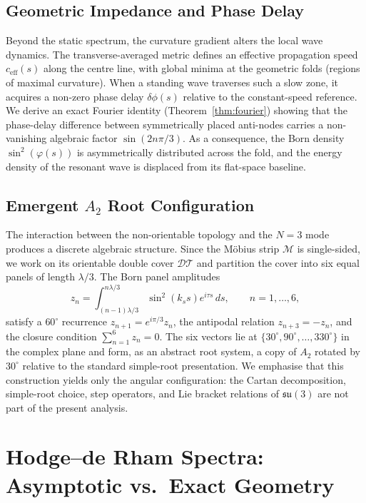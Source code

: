 \documentclass[11pt,a4paper]{article}
\begin{document}
\subsection{Geometric Impedance and Phase Delay}
Beyond the static spectrum, the curvature gradient alters the local wave dynamics. The transverse-averaged metric defines an effective propagation speed $c_{\text{eff}}(s)$ along the centre line, with global minima at the geometric folds (regions of maximal curvature). When a standing wave traverses such a slow zone, it acquires a non-zero phase delay $\delta\phi(s)$ relative to the constant-speed reference. We derive an exact Fourier identity (Theorem~\ref{thm:fourier}) showing that the phase-delay difference between symmetrically placed anti-nodes carries a non-vanishing algebraic factor $\sin(2n\pi/3)$. As a consequence, the Born density $\sin^{2}(\varphi(s))$ is asymmetrically distributed across the fold, and the energy density of the resonant wave is displaced from its flat-space baseline.

\subsection{Emergent $A_2$ Root Configuration}
The interaction between the non-orientable topology and the $N=3$ mode produces a discrete algebraic structure. Since the M\"obius strip $\mathcal{M}$ is single-sided, we work on its orientable double cover $\mathcal{DT}$ and partition the cover into six equal panels of length $\lambda/3$. The Born panel amplitudes
\begin{equation*}
z_{n} = \int_{(n-1)\lambda/3}^{n\lambda/3} \sin^{2}(k_{s}s) e^{i\tau s}\,ds, \qquad n=1,\dots,6,
\end{equation*}
satisfy a $60^\circ$ recurrence $z_{n+1}=e^{i\pi/3}z_{n}$, the antipodal relation $z_{n+3}=-z_{n}$, and the closure condition $\sum_{n=1}^{6}z_{n}=0$. The six vectors lie at $\{30^\circ,90^\circ,\dots,330^\circ\}$ in the complex plane and form, as an abstract root system, a copy of $A_{2}$ rotated by $30^\circ$ relative to the standard simple-root presentation. We emphasise that this construction yields only the angular configuration: the Cartan decomposition, simple-root choice, step operators, and Lie bracket relations of $\mathfrak{su}(3)$ are not part of the present analysis.

\section{Hodge--de Rham Spectra: Asymptotic vs.\ Exact Geometry}
\end{document}
